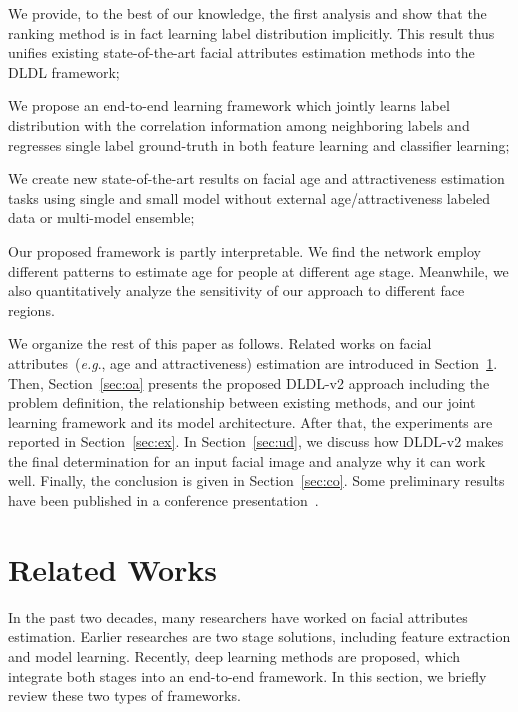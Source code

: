 \documentclass[5p,times,twocolumn]{elsarticle}
\makeatletter
\newcommand{\squishlist}{
 \begin{list}{}
  { \setlength{\itemsep}{0pt}
     \setlength{\parsep}{1pt}
     \setlength{\topsep}{1pt}
     \setlength{\partopsep}{0pt}
     \setlength{\leftmargin}{1.5em}
     \setlength{\labelwidth}{1em}
     \setlength{\labelsep}{0.5em} } }
\newcommand{\squishend}{
  \end{list}  }
\DeclareRobustCommand\onedot{\@onedot}
\def\@onedot{.}
\def\eg{\emph{e.g}\onedot}
\makeatother
\begin{document}
\squishlist
 \item We provide, to the best of our knowledge, the first analysis and show that the ranking method is in fact learning label distribution implicitly. This result thus unifies existing state-of-the-art facial attributes estimation methods into the DLDL framework;
 \item We propose an end-to-end learning framework which jointly learns label distribution with the correlation information among neighboring labels and regresses single label ground-truth in both feature learning and classifier learning;
 \item We create new state-of-the-art results on facial age and attractiveness estimation tasks using single and small model without external age/attractiveness labeled data or multi-model ensemble;
 \item Our proposed framework is partly interpretable. We find the network employ different patterns to estimate age for people at different age stage. Meanwhile, we also quantitatively analyze the sensitivity of our approach to different face regions.
\squishend

We organize the rest of this paper as follows. Related works on facial attributes~(\eg, age and attractiveness) estimation are introduced in Section~\ref{sec:rw}. Then, Section~\ref{sec:oa} presents the proposed DLDL-v2 approach including the problem definition, the relationship between existing methods, and our joint learning framework and its model architecture. After that, the experiments are reported in Section~\ref{sec:ex}. In Section~\ref{sec:ud}, we discuss how DLDL-v2 makes the final determination for an input facial image and analyze why it can work well. Finally, the conclusion is given in Section~\ref{sec:co}. Some preliminary results have been published in a conference presentation~\cite{gao2018dldlv2}.

\section{Related Works}\label{sec:rw}
In the past two decades, many researchers have worked on facial attributes estimation. Earlier researches are two stage solutions, including feature extraction and model learning. Recently, deep learning methods are proposed, which integrate both stages into an end-to-end framework. In this section, we briefly review these two types of frameworks.
\end{document}
